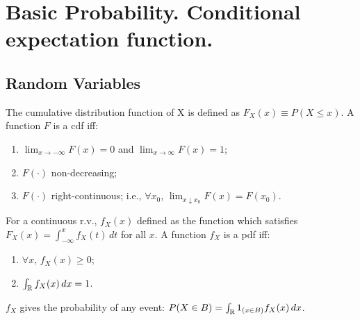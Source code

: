 \documentclass[DIV=14,titlepage=false]{scrreprt}
\begin{document}
\vspace{-10pt}
\chapter{Basic Probability. Conditional expectation function.}
\section{Random Variables}

\begin{definition}
  The cumulative distribution function of X is  defined as $ F_X(x) \equiv P(X \leq x) $. 
  A function $ F $ is a cdf iff:
  \begin{enumerate}
  \item $ \lim_{x \to -\infty} F(x) = 0 $ and $ \lim_{x \to \infty} F(x) = 1 $;
  \item $ F (\cdot) $ non-decreasing;
  \item $ F (\cdot) $ right-continuous; i.e., $ \forall x_0 $, $ \lim_{x \downarrow x_0} F(x) = F(x_0) $.
  \end{enumerate}
\end{definition}
\vspace{5pt}
\begin{definition}
  For a continuous r.v., $ f_X (x) $ defined as the function which satisfies $ F_X(x) = \int_{-\infty}^{x} f_X(t) \, dt $ for all $ x $. A function $ f_X $ is a pdf iff:
  \begin{enumerate}
  \item $ \forall x $, $ f_X(x) \geq 0 $;
  \item $ \int_{\mathbb{R}} f_X(x) \, dx = 1 $.
  \end{enumerate}
\end{definition}
\vspace{5pt}
$ f_X $ gives the probability of any event: $ P (X \in B) = \int_{\mathbb{R}} 1_{(x \in B)} f_X(x) \, dx $.
\end{document}
